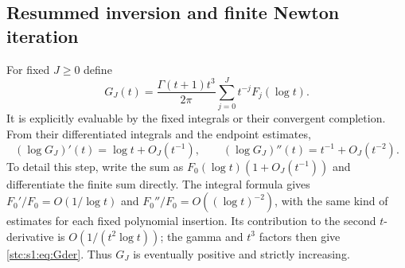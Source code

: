 \documentclass[11pt,letterpaper]{article}
\numberwithin{equation}{section}
\theoremstyle{remark}\newtheorem{remark}[theorem]{Remark}
\newcommand{\Ga}{\Gamma}
\begin{document}
\subsection{Resummed inversion and finite Newton iteration}
For fixed $J\geq0$ define
\begin{equation}\label{stc:s1:eq:G}
 G_J(t)=\frac{\Ga(t+1)t^3}{2\pi}
              \sum_{j=0}^J t^{-j}F_j(\log t).
\end{equation}
It is explicitly evaluable by the fixed integrals or their convergent completion. From their differentiated integrals and the endpoint estimates,
\begin{equation}\label{stc:s1:eq:Gder}
 (\log G_J)'(t)=\log t+O_J(t^{-1}),\qquad
 (\log G_J)''(t)=t^{-1}+O_J(t^{-2}).
\end{equation}
To detail this step, write the sum as $F_0(\log t)(1+O_J(t^{-1}))$ and differentiate the finite sum directly. The integral formula gives $F_0'/F_0=O(1/\log t)$ and $F_0''/F_0=O((\log t)^{-2})$, with the same kind of estimates for each fixed polynomial insertion. Its contribution to the second $t$-derivative is $O(1/(t^2\log t))$; the gamma and $t^3$ factors then give \eqref{stc:s1:eq:Gder}. Thus $G_J$ is eventually positive and strictly increasing.
\end{document}
